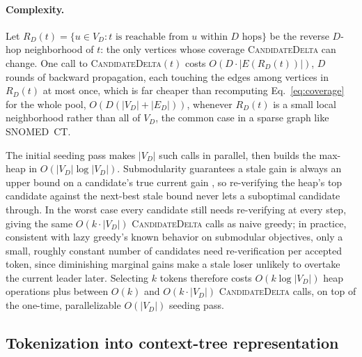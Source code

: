 \paragraph{Complexity.} Let $R_D(t) = \{u \in V_D : t \text{ is reachable
from } u \text{ within } D \text{ hops}\}$ be the reverse $D$-hop
neighborhood of $t$: the only vertices whose coverage
\textsc{CandidateDelta} can change. One call to \textsc{CandidateDelta}$(t)$
costs $O(D \cdot |E(R_D(t))|)$, $D$ rounds of backward propagation, each
touching the edges among vertices in $R_D(t)$ at most once, which is far
cheaper than recomputing Eq.~\eqref{eq:coverage} for the whole pool,
$O(D(|V_D|+|E_D|))$, whenever $R_D(t)$ is a small local neighborhood rather
than all of $V_D$, the common case in a sparse graph like SNOMED~CT.

The initial seeding pass makes $|V_D|$ such calls in parallel,
then builds the max-heap in $O(|V_D| \log |V_D|)$. Submodularity guarantees
a stale gain is always an upper bound on a candidate's true current gain
, so re-verifying the heap's top
candidate against the next-best stale bound never lets a suboptimal
candidate through. In the worst case every candidate still needs
re-verifying at every step, giving the same $O(k \cdot |V_D|)$
\textsc{CandidateDelta} calls as naive greedy; in practice, consistent with
lazy greedy's known behavior on submodular objectives, only a small,
roughly constant number of candidates need re-verification per accepted
token, since diminishing marginal gains make a stale loser unlikely to
overtake the current leader later. Selecting $k$ tokens therefore costs
$O(k \log |V_D|)$ heap operations plus between $O(k)$ and $O(k \cdot
|V_D|)$ \textsc{CandidateDelta} calls, on top of the one-time,
parallelizable $O(|V_D|)$ seeding pass.



\subsection{Tokenization into context-tree representation}
\label{sec:method:tokenizer}

